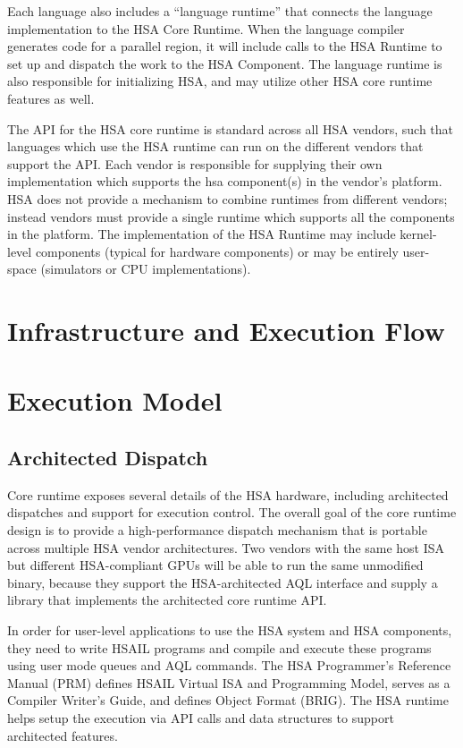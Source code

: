 \documentclass{book}
\newcommand{\diffblock}[1]{#1}
\begin{document}
Each language also includes a “language runtime” that connects the
language implementation to the HSA Core Runtime.   When the language
compiler generates code for a parallel region, it will include calls
to the HSA Runtime to set up and dispatch the work to the HSA
Component.   The language runtime is also responsible for
initializing HSA, and may utilize other HSA core runtime features as
well.

The API for the HSA core runtime is standard across all HSA vendors,
such that languages which use the HSA runtime can run on the
different vendors that support the API.  Each vendor is responsible
for supplying their own implementation which supports the hsa
component(s) in the vendor’s platform.   HSA does not provide a
mechanism to combine runtimes from different vendors; instead
vendors must provide a single runtime which supports all the
components in the platform.
The implementation of the HSA Runtime may include kernel-level
components (typical for hardware components) or may be entirely
user-space (simulators or CPU implementations).

\hypertarget{glue}{}\section{ Infrastructure and Execution
Flow}\label{glue}

\diffblock{
\hypertarget{executionmodel}{}\section{Execution
Model}\label{executionmodel}
}
\diffblock{\hypertarget{archdispatch}{}\subsection{Architected Dispatch}
\label{archdispatch}}
Core runtime exposes several details of the HSA hardware,
including architected dispatches and support for execution control.
The overall goal of the core runtime design is to provide a
high-\/performance dispatch mechanism that is portable across
multiple H\-S\-A vendor architectures. Two vendors with the same
host I\-S\-A but different H\-S\-A-\/compliant G\-P\-Us will be able
to run the same unmodified binary, because they support the
H\-S\-A-\/architected A\-Q\-L interface and supply a library
that implements the architected core runtime A\-P\-I.

In order for user-level applications to use the HSA system and HSA
components, they need to write HSAIL programs and compile and
execute these programs using user mode queues and AQL commands.  The
HSA Programmer’s Reference Manual (PRM) defines HSAIL Virtual ISA
and Programming Model, serves as a Compiler Writer’s Guide, and
defines Object Format (BRIG). The HSA runtime helps setup the
execution via API calls and data structures to support architected
features.
\end{document}
